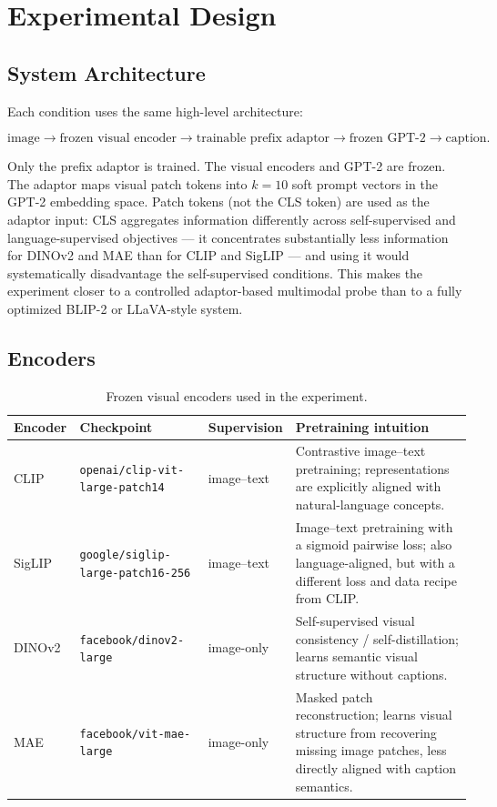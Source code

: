 \documentclass[11pt]{article}
\newcommand{\code}[1]{\texttt{#1}}
\begin{document}
\section{Experimental Design}

\subsection{System Architecture}

Each condition uses the same high-level architecture:

\[
\text{image} \rightarrow \text{frozen visual encoder} \rightarrow
\text{trainable prefix adaptor} \rightarrow \text{frozen GPT-2} \rightarrow
\text{caption}.
\]

Only the prefix adaptor is trained. The visual encoders and GPT-2 are frozen.
The adaptor maps visual patch tokens into \(k=10\) soft prompt vectors in the
GPT-2 embedding space. Patch tokens (not the CLS token) are used as the
adaptor input: CLS aggregates information differently across self-supervised
and language-supervised objectives --- it concentrates substantially less
information for DINOv2 and MAE than for CLIP and SigLIP --- and using it
would systematically disadvantage the self-supervised conditions. This
makes the experiment closer to a controlled adaptor-based multimodal probe
than to a fully optimized BLIP-2 or LLaVA-style system.

\subsection{Encoders}

\begin{table}[!htbp]
\centering
\caption{Frozen visual encoders used in the experiment.}
\label{tab:encoders}
\begin{tabularx}{\textwidth}{@{}l l l X@{}}
\toprule
Encoder & Checkpoint & Supervision & Pretraining intuition \\
\midrule
CLIP~\cite{radford2021clip} & \code{openai/clip-vit-large-patch14} & image--text &
Contrastive image--text pretraining; representations are explicitly aligned
with natural-language concepts. \\
SigLIP~\cite{zhai2023siglip} & \code{google/siglip-large-patch16-256} & image--text &
Image--text pretraining with a sigmoid pairwise loss; also language-aligned,
but with a different loss and data recipe from CLIP. \\
DINOv2~\cite{oquab2023dinov2} & \code{facebook/dinov2-large} & image-only &
Self-supervised visual consistency / self-distillation; learns semantic visual
structure without captions. \\
MAE~\cite{he2022mae} & \code{facebook/vit-mae-large} & image-only &
Masked patch reconstruction; learns visual structure from recovering missing
image patches, less directly aligned with caption semantics. \\
\bottomrule
\end{tabularx}
\end{table}
\end{document}
